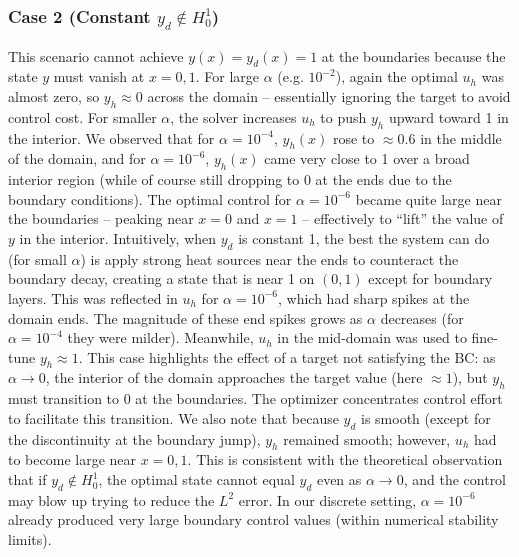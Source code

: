 \documentclass{article}
\begin{document}
\subsubsection{Case 2 (Constant $y_d\notin H^1_0$)}
This scenario cannot achieve $y(x)=y_d(x)=1$ at the boundaries because the state $y$ must vanish at $x=0,1$. For large $\alpha$ (e.g. $10^{-2}$), again the optimal $u_h$ was almost zero, so $y_h\approx 0$ across the domain – essentially ignoring the target to avoid control cost. For smaller $\alpha$, the solver increases $u_h$ to push $y_h$ upward toward 1 in the interior. We observed that for $\alpha=10^{-4}$, $y_h(x)$ rose to $\approx 0.6$ in the middle of the domain, and for $\alpha=10^{-6}$, $y_h(x)$ came very close to 1 over a broad interior region (while of course still dropping to 0 at the ends due to the boundary conditions). The optimal control for $\alpha=10^{-6}$ became quite large near the boundaries – peaking near $x=0$ and $x=1$ – effectively to “lift” the value of $y$ in the interior. Intuitively, when $y_d$ is constant 1, the best the system can do (for small $\alpha$) is apply strong heat sources near the ends to counteract the boundary decay, creating a state that is near 1 on $(0,1)$ except for boundary layers. This was reflected in $u_h$ for $\alpha=10^{-6}$, which had sharp spikes at the domain ends. The magnitude of these end spikes grows as $\alpha$ decreases (for $\alpha=10^{-4}$ they were milder). Meanwhile, $u_h$ in the mid-domain was used to fine-tune $y_h\approx 1$. This case highlights the effect of a target not satisfying the BC: as $\alpha\to0$, the interior of the domain approaches the target value (here $\approx 1$), but $y_h$ must transition to 0 at the boundaries. The optimizer concentrates control effort to facilitate this transition. We also note that because $y_d$ is smooth (except for the discontinuity at the boundary jump), $y_h$ remained smooth; however, $u_h$ had to become large near $x=0,1$. This is consistent with the theoretical observation that if $y_d\notin H^1_0$, the optimal state cannot equal $y_d$ even as $\alpha\to0$, and the control may blow up trying to reduce the $L^2$ error. In our discrete setting, $\alpha=10^{-6}$ already produced very large boundary control values (within numerical stability limits).
\end{document}
